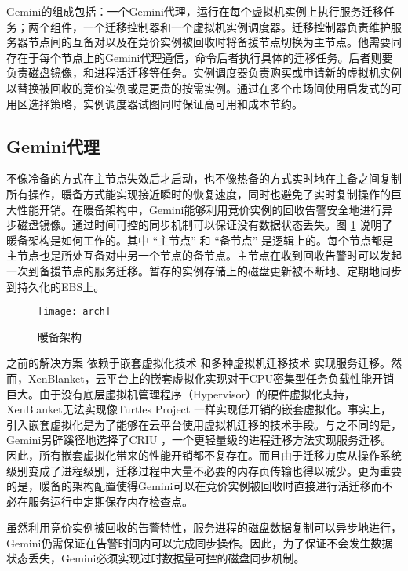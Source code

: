 Gemini的组成包括：一个Gemini代理，运行在每个虚拟机实例上执行服务迁移任务；两个组件，一个迁移控制器和一个虚拟机实例调度器。迁移控制器负责维护服务器节点间的互备对以及在竞价实例被回收时将备援节点切换为主节点。他需要同存在于每个节点上的Gemini代理通信，命令后者执行具体的迁移任务。后者则要负责磁盘镜像，和进程活迁移等任务。实例调度器负责购买或申请新的虚拟机实例以替换被回收的竞价实例或是更贵的按需实例。通过在多个市场间使用启发式的可用区选择策略，实例调度器试图同时保证高可用和成本节约。

\subsection{Gemini代理}
不像冷备的方式在主节点失效后才启动，也不像热备的方式实时地在主备之间复制所有操作，暖备方式能实现接近瞬时的恢复速度，同时也避免了实时复制操作的巨大性能开销。在暖备架构中，Gemini能够利用竞价实例的回收告警安全地进行异步磁盘镜像。通过时间可控的同步机制可以保证没有数据状态丢失。图 \ref{figure:arch} 说明了暖备架构是如何工作的。其中 ``主节点'' 和 ``备节点'' 是逻辑上的。每个节点都是主节点也是所处互备对中另一个节点的备节点。主节点在收到回收告警时可以发起一次到备援节点的服务迁移。暂存的实例存储上的磁盘更新被不断地、定期地同步到持久化的EBS上。
\begin{figure}
  \centering
  \texttt{[image: arch]}
  \caption{暖备架构}
  \label{figure:arch}
\end{figure}

之前的解决方案\cite{He:2015:CCH:2749246.2749275} 依赖于嵌套虚拟化技术 \cite{Williams:2012:XVO:2168836.2168849} 和多种虚拟机迁移技术 \cite{Singh:2013:YEG:2482626.2482642, Hines:2009:PBL:1508293.1508301} 实现服务迁移。然而，XenBlanket，云平台上的嵌套虚拟化实现对于CPU密集型任务负载性能开销巨大。由于没有底层虚拟机管理程序（Hypervisor）的硬件虚拟化支持，XenBlanket无法实现像Turtles Project \cite{Ben-Yehuda:2010:TPD:1924943.1924973} 一样实现低开销的嵌套虚拟化。事实上，引入嵌套虚拟化是为了能够在云平台使用虚拟机迁移的技术手段。与之不同的是，Gemini另辟蹊径地选择了CRIU \cite{CRIU:2016}，一个更轻量级的进程迁移方法实现服务迁移。因此，所有嵌套虚拟化带来的性能开销都不复存在。而且由于迁移力度从操作系统级别变成了进程级别，迁移过程中大量不必要的内存页传输也得以减少。更为重要的是，暖备的架构配置使得Gemini可以在竞价实例被回收时直接进行活迁移而不必在服务运行中定期保存内存检查点。

虽然利用竞价实例被回收的告警特性，服务进程的磁盘数据复制可以异步地进行，Gemini仍需保证在告警时间内可以完成同步操作。因此，为了保证不会发生数据状态丢失，Gemini必须实现过时数据量可控的磁盘同步机制。


